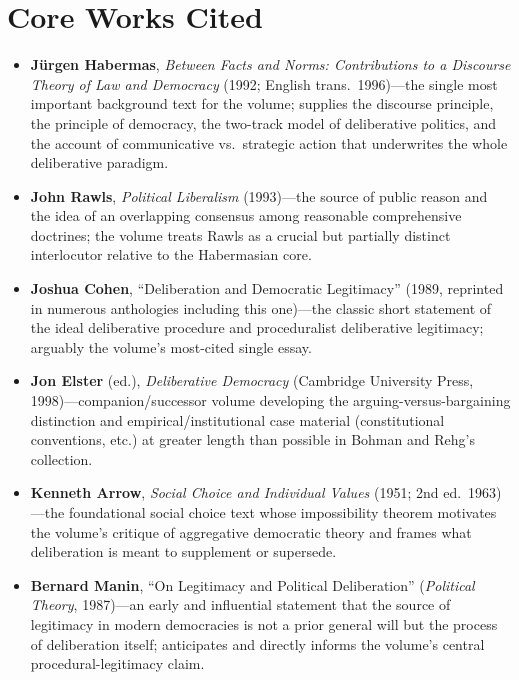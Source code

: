 \documentclass[12pt]{article}
\begin{document}
\section{Core Works Cited}

\begin{itemize}[leftmargin=*, itemsep=4pt]
    \item \textbf{Jürgen Habermas}, \textit{Between Facts and Norms: Contributions to a Discourse Theory of Law and Democracy} (1992; English trans.\ 1996)---the single most important background text for the volume; supplies the discourse principle, the principle of democracy, the two-track model of deliberative politics, and the account of communicative vs.\ strategic action that underwrites the whole deliberative paradigm.
    \item \textbf{John Rawls}, \textit{Political Liberalism} (1993)---the source of public reason and the idea of an overlapping consensus among reasonable comprehensive doctrines; the volume treats Rawls as a crucial but partially distinct interlocutor relative to the Habermasian core.
    \item \textbf{Joshua Cohen}, ``Deliberation and Democratic Legitimacy'' (1989, reprinted in numerous anthologies including this one)---the classic short statement of the ideal deliberative procedure and proceduralist deliberative legitimacy; arguably the volume's most-cited single essay.
    \item \textbf{Jon Elster} (ed.), \textit{Deliberative Democracy} (Cambridge University Press, 1998)---companion/successor volume developing the arguing-versus-bargaining distinction and empirical/institutional case material (constitutional conventions, etc.) at greater length than possible in Bohman and Rehg's collection.
    \item \textbf{Kenneth Arrow}, \textit{Social Choice and Individual Values} (1951; 2nd ed.\ 1963)---the foundational social choice text whose impossibility theorem motivates the volume's critique of aggregative democratic theory and frames what deliberation is meant to supplement or supersede.
    \item \textbf{Bernard Manin}, ``On Legitimacy and Political Deliberation'' (\textit{Political Theory}, 1987)---an early and influential statement that the source of legitimacy in modern democracies is not a prior general will but the process of deliberation itself; anticipates and directly informs the volume's central procedural-legitimacy claim.
\end{itemize}
\end{document}
